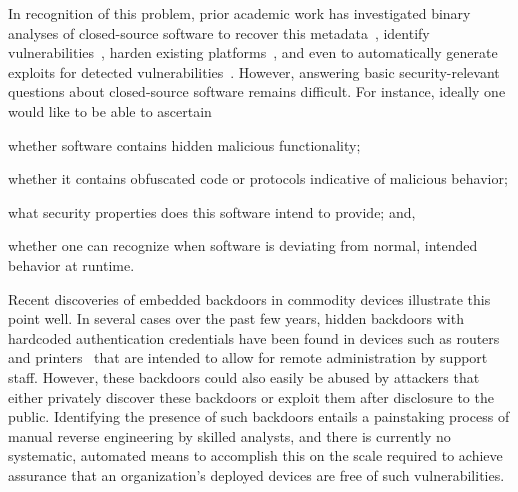 \documentclass[letterpaper,twoside,11pt,headings=small]{scrartcl}
\begin{document}
In recognition of this problem, prior academic work has investigated binary
analyses of closed-source software to recover this
metadata~\cite{lee:ndss2011:tie}, identify vulnerabilities~\cite{kruegel:acsac2004:kernel}, harden existing
platforms~\cite{baliga:gibraltar,chipounov:asplos2011:s2e}, and even to automatically generate
exploits for detected vulnerabilities~\cite{kruegel:sec2005:mimicry,avgerinos:ndss2011:aeg,schwartz:sec2011:q,cha:oakland2012:mayhem}.
However, answering basic security-relevant questions about closed-source
software remains difficult.  For instance, ideally one would like to be
able to ascertain%
\begin{inparaenum}
    \item whether software contains hidden malicious functionality;
    \item whether it contains obfuscated code or protocols indicative of malicious behavior;
    \item what security properties does this software intend to provide; and,
    \item whether one can recognize when software is deviating from normal, intended behavior at runtime.
\end{inparaenum}

Recent discoveries of embedded backdoors in commodity devices illustrate this
point well.  In several cases over the past few years, hidden backdoors with
hardcoded authentication credentials have been found in devices such as
routers~\cite{heffner:dlink-dir100} and printers~\cite{cert:hp-backdoor} that
are intended to allow for remote administration by support staff.  However,
these backdoors could also easily be abused by attackers that either privately
discover these backdoors or exploit them after disclosure to the public.
Identifying the presence of such backdoors entails a painstaking process of
manual reverse engineering by skilled analysts, and there is currently no
systematic, automated means to accomplish this on the scale required to
achieve assurance that an organization's deployed devices are free of such
vulnerabilities.
\end{document}

